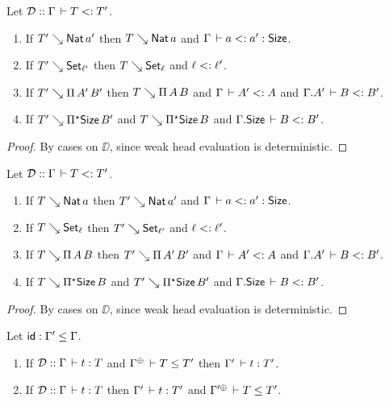 \documentclass[acmlarge,review,anonymous]{acmart}\settopmatter{printfolios=true}
\begin{document}
\begin{lemma}
\label{lem:whdsub}
Let $\DD :: \Gamma \der T \asub T'$.
\begin{enumerate}
\item If\/ $T' \evalsto \Nat a'$ then $T \evalsto \Nat a$ and $\Gamma \der a \asub a' : \Size$.
\item If\/ $T' \evalsto \Set[\ell']$ then $T \evalsto \Set[\ell]$ and $\ell \asub \ell'$.
\item If\/ $T' \evalsto \piT{A'}{B'}$ then $T \evalsto \piT {A} {B}$ and
      $\Gamma \der A' \asub A$ and $\cext \Gamma {A'} \der B \asub B'$.
\item If\/ $T' \evalsto \epiT \Size {B'}$ and $T \evalsto \epiT \Size B$ and $\cext \Gamma \Size \der B \asub B'$.
\end{enumerate}
\end{lemma}
\begin{proof}
  By cases on $\DD$, since weak head evaluation is deterministic.
\end{proof}
\begin{lemma}
\label{lem:whdsuper}
Let $\DD :: \Gamma \der T \asub T'$.
\begin{enumerate}
\item If\/ $T \evalsto \Nat a$ then $T' \evalsto \Nat a'$ and $\Gamma \der a \asub a' : \Size$.
\item If\/ $T \evalsto \Set[\ell]$ then $T' \evalsto \Set[\ell']$ and $\ell \asub \ell'$.
\item If\/ $T \evalsto \piT A B$ then $T' \evalsto \piT {A'} {B'}$ and
      $\Gamma \der A' \asub A$ and $\cext \Gamma {A'} \der B \asub B'$.
\item If\/ $T \evalsto \epiT \Size B$ and $T' \evalsto \epiT \Size B'$ and $\cext \Gamma \Size \der B \asub B'$.
\end{enumerate}
\end{lemma}
\begin{proof}
  By cases on $\DD$, since weak head evaluation is deterministic.
\end{proof}
\begin{lemma}
  \label{lem:subtc}
  Let $\sid : \Gamma' \leq \Gamma$.
  \begin{enumerate}
  \item If\/ $\DD :: \Gamma \der t \jchk T$ and $\resurrect\Gamma \der T \leq T'$ then $\Gamma' \der t \jchk T'$.
  \item If\/ $\DD :: \Gamma \der t \jinf T$ then $\Gamma' \der t \jinf T'$ and $\resurrect{\Gamma'} \der T \leq T'$.
  \end{enumerate}
\end{lemma}
\end{document}
